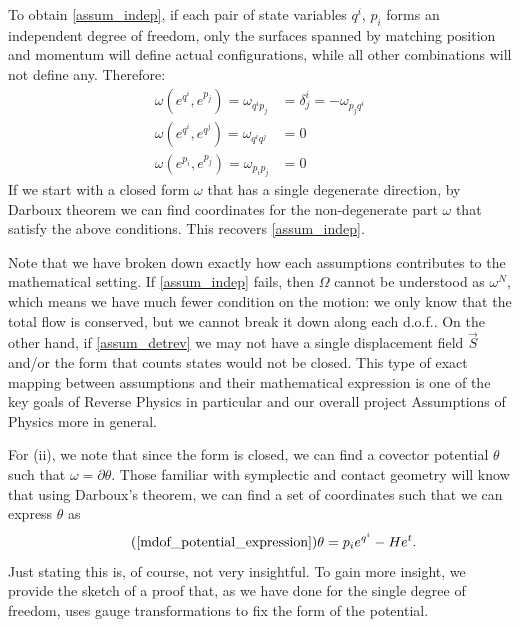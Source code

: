 \documentclass[10pt,twocolumn, nofootinbib]{revtex4-2}
\begin{document}
To obtain \ref{assum_indep}, if each pair of state variables $q^i$, $p_i$ forms an independent degree of freedom, only the surfaces spanned by matching position and momentum will define actual configurations, while all other combinations will not define any. Therefore:
\begin{equation}\label{canonical_conditions}
	\begin{aligned}
		\omega(e^{q^i}, e^{p_j}) = \omega_{q^i p_j} &= \delta^i_j = - \omega_{p_j q^i} \\
		\omega(e^{q^i}, e^{q^j}) = \omega_{q^i q^j} &= 0 \\
		\omega(e^{p_i}, e^{p_j}) = \omega_{p_i p_j} &= 0
	\end{aligned}
\end{equation}
If we start with a closed form $\omega$ that has a single degenerate direction, by Darboux theorem we can find coordinates for the non-degenerate part $\omega$ that satisfy the above conditions. This recovers \ref{assum_indep}.

Note that we have broken down exactly how each assumptions contributes to the mathematical setting. If \ref{assum_indep} fails, then $\Omega$ cannot be understood as $\omega^N$, which means we have much fewer condition on the motion: we only know that the total flow is conserved, but we cannot break it down along each d.o.f.. On the other hand, if \ref{assum_detrev} we may not have a single displacement field $\vec{S}$ and/or the form that counts states would not be closed. This type of exact mapping between assumptions and their mathematical expression is one of the key goals of Reverse Physics in particular and our overall project Assumptions of Physics more in general.

For (ii), we note that since the form is closed, we can find a covector potential $\theta$ such that $\omega=\partial \theta$. Those familiar with symplectic and contact geometry will know that using Darboux's theorem, we can find a set of coordinates such that we can express $\theta$ as
\begin{equation}
	\tag*{(\ref{mdof_potential_expression})}
	\theta = p_i e^{q^i} - H e^t.
\end{equation}
Just stating this is, of course, not very insightful. To gain more insight, we provide the sketch of a proof that, as we have done for the single degree of freedom, uses gauge transformations to fix the form of the potential. 
\end{document}
